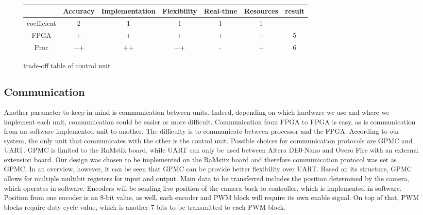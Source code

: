 \begin{figure}[!ht]
\hspace{-1cm}
\begin{tabular}{|c|c|c|c|c|c|c|}\hline
                         & Accuracy  & Implementation & Flexibility & Real-time & Resources & result \\\hline
coefficient   &         2          &           1                      &         1           &           1         &         1               &             \\\hline
FPGA            &      +            &            +                     &         +          &          +         &         +              &   5     \\\hline
Proc               &      ++          &          ++                   &         ++       &         -           &         +              &       6    \\\hline
\end{tabular}
\caption{trade-off table of control unit}
\end{figure}

\subsection{Communication}

Another parameter to keep in mind is communication between units. Indeed, depending on which hardware we use and where we implement each unit, communication could be easier or more difficult. Communication from FPGA to FPGA is easy, as is communication from an software implemented unit to another. The difficulty is to communicate between processor and the FPGA. According to our system, the only unit that communicates with the other is the control unit. Possible choices for communication protocols are GPMC and UART. GPMC is limited to the RaMstix board, while UART can only be used between Altera DE0-Nano and Overo Fire with an external extension board. Our design was chosen to be implemented on the RaMstix board and therefore communication protocol was set as GPMC. In an overview, however, it can be seen that GPMC can be provide better flexibility over UART. Based on its structure, GPMC allows for multiple multibit registers for input and output. Main data to be transferred includes the position determined by the camera, which operates in software. Encoders will be sending live position of the camera back to controller, which is implemented in software. Position from one encoder is an 8-bit value, as well, each encoder and PWM block will require its own enable signal. On top of that, PWM blocks require duty cycle value, which is another 7 bits to be transmitted to each PWM block.\\

